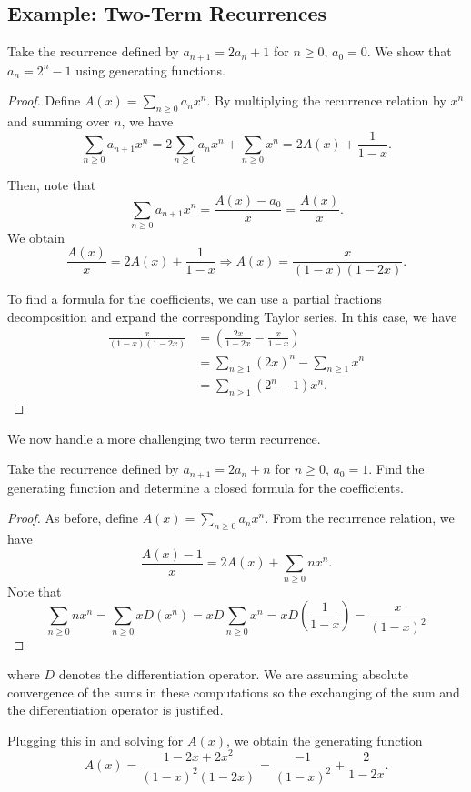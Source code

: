 \documentclass[11pt]{article}
\renewcommand{\>}{\rangle}
\newcommand{\<}{\langle}
\begin{document}
\subsection{Example: Two-Term Recurrences}
\begin{example}
Take the recurrence defined by $a_{n+1} = 2a_n + 1$ for $n \ge 0$, $a_0 = 0$.  We show that $a_n = 2^n - 1$ using generating functions.
\end{example}
\begin{proof}
Define $A(x) = \sum_{n \ge 0} a_n x^n$.  By multiplying the recurrence relation by $x^n$ and summing over $n$, we have 
$$\sum_{n \ge 0} a_{n+1}x^n = 2\sum_{n \ge 0}a_n x^n + \sum_{n \ge 0} x^n = 2A(x) + \frac{1}{1-x}.$$

Then, note that 
$$\sum_{n \ge 0} a_{n+1} x^n = \frac{A(x) - a_0}{x} = \frac{A(x)}{x}.$$
We obtain
$$\frac{A(x)}{x} = 2A(x) + \frac{1}{1-x} \Longrightarrow A(x) = \frac{x}{(1-x)(1-2x)}.$$

To find a formula for the coefficients, we can use a partial fractions decomposition and expand the corresponding Taylor series.  In this case, we have 
\begin{align*}
\frac{x}{(1-x)(1-2x)} &=  \left(\frac{2x}{1-2x} - \frac{x}{1-x} \right) \\
&= \sum_{n \ge 1} (2x)^n - \sum_{n \ge 1} x^n \\
&= \sum_{n \ge 1} (2^n - 1) x^n.
\end{align*}
\end{proof} 
We now handle a more challenging two term recurrence.
 \begin{example}
Take the recurrence defined by $a_{n+1} = 2a_n + n$ for $n \ge 0$, $a_0 = 1$.  Find the generating function and determine a closed formula for the coefficients.
\end{example}
\begin{proof}
As before, define $A(x) = \sum_{n \ge 0} a_n x^n$.  From the recurrence relation, we have 
$$\frac{A(x) - 1}{x} = 2A(x) + \sum_{n \ge 0} n x^n.$$
Note that 
$$\sum_{n \ge 0} nx^n = \sum_{n \ge 0} x D(x^n) = xD\sum_{n \ge 0} x^n = xD \left(\frac{1}{1-x} \right) = \frac{x}{(1-x)^2}$$
\end{proof}
where $D$ denotes the differentiation operator.  We are assuming absolute convergence of the sums in these computations so the exchanging of the sum and the differentiation operator is justified.  

Plugging this in and solving for $A(x)$, we obtain the generating function
$$A(x) = \frac{1 - 2x + 2x^2}{(1-x)^2(1-2x)}= \frac{-1}{(1-x)^2} + \frac{2}{1-2x}.$$
\end{document}
